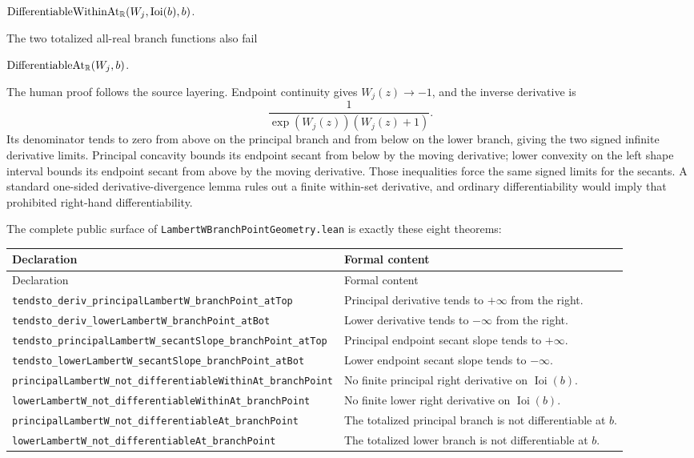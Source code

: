 \documentclass[11pt,oneside]{article}
\theoremstyle{definition}
\theoremstyle{remark}
\begin{document}
\begin{center}
\(\operatorname{DifferentiableWithinAt}_{\mathbb{R}}
  (W_j,\operatorname{Ioi}(b),b)\).
\end{center}

The two totalized all-real branch functions also fail

\begin{center}
\(\operatorname{DifferentiableAt}_{\mathbb{R}}(W_j,b)\).
\end{center}

The human proof follows the source layering.  Endpoint continuity gives
\(W_j(z)\to-1\), and the inverse derivative is
\[
 \frac{1}{\exp(W_j(z))(W_j(z)+1)}.
\]
Its denominator tends to zero from above on the principal branch and from
below on the lower branch, giving the two signed infinite derivative limits.
Principal concavity bounds its endpoint secant from below by the moving
derivative; lower convexity on the left shape interval bounds its endpoint
secant from above by the moving derivative.  Those inequalities force the
same signed limits for the secants.  A standard one-sided derivative-divergence
lemma rules out a finite within-set derivative, and ordinary differentiability
would imply that prohibited right-hand differentiability.

The complete public surface of
\nolinkurl{LambertWBranchPointGeometry.lean} is exactly these eight theorems:
\begin{longtable}{@{}>{\raggedright\arraybackslash}p{}
                         >{\raggedright\arraybackslash}p{}@{}}
\toprule
Declaration & Formal content \\
\midrule
\endfirsthead
\toprule
Declaration & Formal content \\
\midrule
\endhead
\nolinkurl{tendsto_deriv_principalLambertW_branchPoint_atTop} & Principal derivative tends to \(+\infty\) from the right. \\
\nolinkurl{tendsto_deriv_lowerLambertW_branchPoint_atBot} & Lower derivative tends to \(-\infty\) from the right. \\
\nolinkurl{tendsto_principalLambertW_secantSlope_branchPoint_atTop} & Principal endpoint secant slope tends to \(+\infty\). \\
\nolinkurl{tendsto_lowerLambertW_secantSlope_branchPoint_atBot} & Lower endpoint secant slope tends to \(-\infty\). \\
\nolinkurl{principalLambertW_not_differentiableWithinAt_branchPoint} & No finite principal right derivative on \(\operatorname{Ioi}(b)\). \\
\nolinkurl{lowerLambertW_not_differentiableWithinAt_branchPoint} & No finite lower right derivative on \(\operatorname{Ioi}(b)\). \\
\nolinkurl{principalLambertW_not_differentiableAt_branchPoint} & The totalized principal branch is not differentiable at \(b\). \\
\nolinkurl{lowerLambertW_not_differentiableAt_branchPoint} & The totalized lower branch is not differentiable at \(b\). \\
\bottomrule
\end{longtable}
\end{document}
